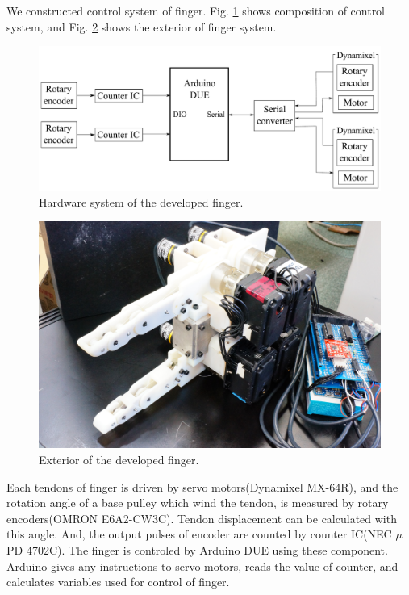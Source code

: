 \documentclass{llncs}
\begin{document}
We constructed control system of finger.
Fig. \ref{fig:system} shows composition of control system, and Fig. \ref{pic:finger} shows the exterior of finger system.
	\begin{figure}[tb]
		\centering
		\includegraphics[width=.90\textwidth]{./figure/system.pdf}
		\caption{Hardware system of the developed finger.}
		\label{fig:system}
	\end{figure}
	\begin{figure}[tb]
		\centering
		\includegraphics[width=.50\textwidth]{./figure/JPG/finger1.eps}
		\caption{Exterior of the developed finger.}
		\label{pic:finger}
	\end{figure}
Each tendons of finger is driven by servo motors(Dynamixel MX-64R), and
the rotation angle of a base pulley which wind the tendon, is measured by rotary encoders(OMRON E6A2-CW3C).
Tendon displacement can be calculated with this angle.
And, the output pulses of encoder are counted by counter IC(NEC $\mu$PD 4702C).
The finger is controled by Arduino DUE using these component.
Arduino gives any instructions to servo motors, reads the value of counter, and calculates variables used for control of finger.
\end{document}
